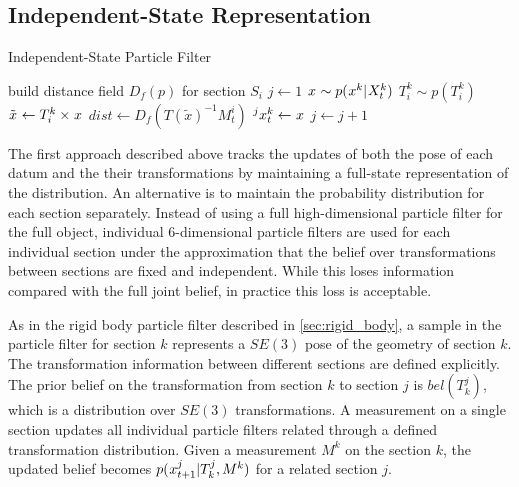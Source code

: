 \documentclass[letterpaper, 10 pt, conference]{ieeeconf}
\newcommand{\sampled}{\tilde}
\newcommand{\measurement}{m}
\begin{document}
\subsection{Independent-State Representation} \label{sec:independent state}

\begin{algorithm}[t]
  \caption{Independent-State Particle Filter}\label{alg:indep}
  \begin{algorithmic}[1]
    \Require{observation $\measurement^i_t$}
    \State build distance field $D_f(p)$ for section $S_i$
    \State $j \gets 1$
    \State $\particle\sim p(\particle[][][k]|\particles[t][][k])$
    \State $T^k_i\sim p(T^k_i)$ 
    \State $\sampled \particle\gets T^k_i\times \particle$ 
    \State $dist \gets D_f(T(\sampled x)^{-1}M^i_t)$
    \State $\particle[t][j][k]\gets \particle$
    \State $j \gets j+1$
    \EndIf
    \EndWhile
    \EndFor
  \end{algorithmic}
\end{algorithm}

The first approach described above tracks the updates of both the pose of each datum and the their transformations by maintaining a full-state representation of the distribution.
An alternative is to maintain the probability distribution for each section separately.
Instead of using a full high-dimensional particle filter for the full object, individual 6-dimensional particle filters are used for each individual section under the approximation that the belief over transformations between sections are fixed and independent.
While this loses information compared with the full joint belief, in practice this loss is acceptable.

As in the rigid body particle filter described in \ref{sec:rigid_body}, a sample in the particle filter for section $k$ represents a $SE(3)$ pose of the geometry of section $k$. 
The transformation information between different sections are defined explicitly. 
The prior belief on the transformation from section $k$ to section $j$ is $bel(T^j_k)$, which is a distribution over $SE(3)$ transformations. 
A measurement on a single section updates all individual particle filters related through a defined transformation distribution.
Given a measurement $M^k$ on the section $k$, the updated belief becomes $p(\particle[t+1][][j]|T^j_k,M^k)$ for a related section $j$.
\end{document}
